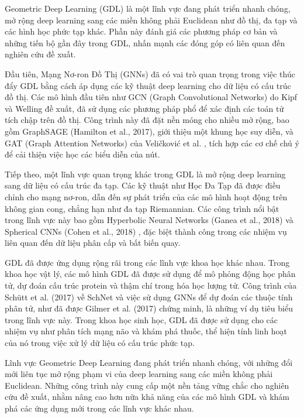Geometric Deep Learning (GDL) là một lĩnh vực đang phát triển nhanh chóng, mở rộng deep learning sang các miền không phải Euclidean như đồ thị, đa tạp và các hình học phức tạp khác. Phần này đánh giá các phương pháp cơ bản và những tiến bộ gần đây trong GDL, nhấn mạnh các đóng góp có liên quan đến nghiên cứu đề xuất.

Đầu tiên, Mạng Nơ-ron Đồ Thị (GNNs) đã có vai trò quan trọng trong việc thúc đẩy GDL bằng cách áp dụng các kỹ thuật deep learning cho dữ liệu có cấu trúc đồ thị. Các mô hình đầu tiên như GCN (Graph Convolutional Networks) do Kipf và Welling \cite{gcn_paper} đề xuất, đã sử dụng các phương pháp phổ để xác định các toán tử tích chập trên đồ thị. Công trình này đã đặt nền móng cho nhiều mở rộng, bao gồm GraphSAGE (Hamilton et al., 2017)\cite{graph_sage}, giới thiệu một khung học suy diễn, và GAT (Graph Attention Networks) của Veličković et al. \cite{graph_sage}, tích hợp các cơ chế chú ý để cải thiện việc học các biểu diễn của nút.

Tiếp theo, một lĩnh vực quan trọng khác trong GDL là mở rộng deep learning sang dữ liệu có cấu trúc đa tạp. Các kỹ thuật như Học Đa Tạp đã được điều chỉnh cho mạng nơ-ron, dẫn đến sự phát triển của các mô hình hoạt động trên không gian cong, chẳng hạn như đa tạp Riemannian. Các công trình nổi bật trong lĩnh vực này bao gồm Hyperbolic Neural Networks (Ganea et al., 2018) \cite{hyperbolicneuralnetworks} và Spherical CNNs (Cohen et al., 2018) \cite{cohen2018sphericalcnns}, đặc biệt thành công trong các nhiệm vụ liên quan đến dữ liệu phân cấp và bất biến quay.

GDL đã được ứng dụng rộng rãi trong các lĩnh vực khoa học khác nhau. Trong khoa học vật lý, các mô hình GDL đã được sử dụng để mô phỏng động học phân tử, dự đoán cấu trúc protein và thậm chí trong hóa học lượng tử. Công trình của Schütt et al. (2017) về SchNet \cite{schütt2017schnetcontinuousfilterconvolutionalneural} và việc sử dụng GNNs để dự đoán các thuộc tính phân tử, như đã được Gilmer et al. (2017) \cite{gilmer2017neuralmessagepassingquantum} chứng minh, là những ví dụ tiêu biểu trong lĩnh vực này. Trong khoa học sinh học, GDL đã được sử dụng cho các nhiệm vụ như phân tích mạng não và khám phá thuốc, thể hiện tính linh hoạt của nó trong việc xử lý dữ liệu có cấu trúc phức tạp.

Lĩnh vực Geometric Deep Learning đang phát triển nhanh chóng, với những đổi mới liên tục mở rộng phạm vi của deep learning sang các miền không phải Euclidean. Những công trình này cung cấp một nền tảng vững chắc cho nghiên cứu đề xuất, nhằm nâng cao hơn nữa khả năng của các mô hình GDL và khám phá các ứng dụng mới trong các lĩnh vực khác nhau.